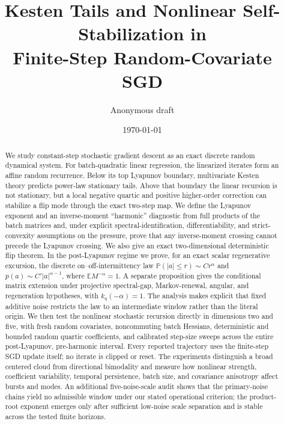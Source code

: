 \documentclass[11pt]{article}
\title{\textbf{Kesten Tails and Nonlinear Self-Stabilization in}\\
Finite-Step Random-Covariate SGD}
\author{Anonymous draft}
\date{\today}
\theoremstyle{definition}
\newcommand{\E}{\mathbb E}
\newcommand{\Pp}{\mathbb P}
\begin{document}
\maketitle

\begin{abstract}
We study constant-step stochastic gradient descent as an exact discrete
random dynamical system.  For batch-quadratic linear regression, the
linearized iterates form an affine random recurrence.  Below its top
Lyapunov boundary, multivariate Kesten theory predicts power-law stationary
tails.  Above that boundary the linear recursion is not stationary, but a
local negative quartic and positive higher-order correction can stabilize a
flip mode through the exact two-step map.  We define the Lyapunov exponent
and an inverse-moment ``harmonic'' diagnostic from full products of the batch
matrices and, under explicit spectral-identification, differentiability, and
strict-convexity assumptions on the pressure, prove that any inverse-moment
crossing cannot precede the Lyapunov crossing.  We also give an exact
two-dimensional deterministic flip theorem.  In the post-Lyapunov regime we
prove, for an exact scalar regenerative excursion, the discrete
on--off-intermittency law
$\Pp(|a|\leq r)\sim C r^\alpha$ and
$p(a)\sim C'|a|^{\alpha-1}$, where
$\E M^{-\alpha}=1$.  A separate proposition gives the conditional matrix
extension under projective spectral-gap, Markov-renewal, angular, and
regeneration hypotheses, with $k_\eta(-\alpha)=1$.  The analysis makes
explicit that fixed additive noise restricts the law to an intermediate
window rather than the literal origin.
We then test the nonlinear stochastic recursion directly in dimensions two and
five, with fresh random covariates, noncommuting batch Hessians, deterministic
and bounded random quartic coefficients, and calibrated step-size sweeps across the
entire post-Lyapunov, pre-harmonic interval.  Every reported trajectory uses
the finite-step SGD update itself; no iterate is clipped or reset.  The
experiments distinguish a broad centered cloud from directional bimodality
and measure how nonlinear strength, coefficient variability, temporal
persistence, batch size, and covariance anisotropy affect bursts and modes.
An additional five-noise-scale audit shows that the primary-noise chains
yield no admissible window under our stated operational criterion; the
product-root exponent emerges only after sufficient low-noise scale
separation and is stable across the tested finite horizons.
\end{abstract}
\end{document}
